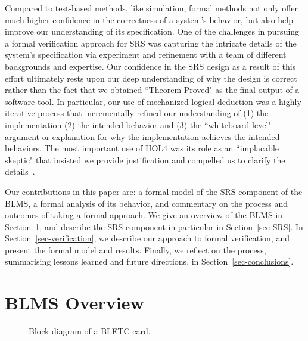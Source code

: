 \documentclass{llncs}
\begin{document}
Compared to test-based methods, like simulation, formal methods not only offer much higher confidence in the correctness of a system's behavior, but also help improve our understanding of its specification.
One of the challenges in pursuing a formal verification approach for SRS was capturing the intricate details of the system's specification via experiment and refinement with a team of different backgrounds and expertise.
Our confidence in the SRS design as a result of this effort ultimately rests upon our deep understanding of why the design is correct rather than the fact that we obtained ``Theorem Proved" as the final output of a software tool.
In particular, our use of mechanized logical deduction was a highly iterative process that incrementally refined our understanding of (1) the implementation (2) the intended behavior and (3) the ``whiteboard-level" argument or explanation for why the implementation achieves the intended behaviors.
The most important use of HOL4  was its role as an ``implacable skeptic" that insisted we provide justification and compelled us to clarify the details~\cite{rushby}.

Our contributions in this paper are: a formal model of the SRS component of the BLMS, a formal analysis of its behavior, and commentary on the process and outcomes of taking a formal approach.
We give an overview of the BLMS in Section~\ref{sec-BLM}, and describe the SRS component in particular in Section~\ref{sec-SRS}.
In Section~\ref{sec-verification}, we describe our approach to formal verification, and present the formal model and results.
Finally, we reflect on the process, summarising lessons learned and future directions, in Section~\ref{sec-conclusions}.

\section{BLMS Overview}
\label{sec-BLM}

\begin{figure}[t]
  \centering  {}
   \caption{Block diagram of a BLETC card.}
  \label{fig:BLETC}
\end{figure}
\end{document}
